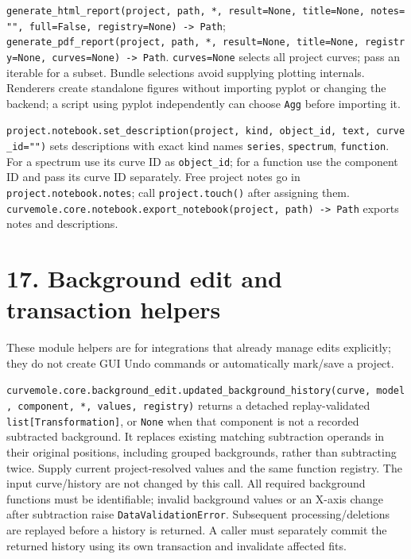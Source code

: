 \documentclass[
  10pt,
  a4paper,
  oneside]{scrreprt}
\begin{document}
\texttt{generate\_html\_report(project,\ path,\ *,\ result=None,\ title=None,\ notes="",\ full=False,\ registry=None)\ -\textgreater{}\ Path};
\texttt{generate\_pdf\_report(project,\ path,\ *,\ result=None,\ title=None,\ registry=None,\ curves=None)\ -\textgreater{}\ Path}.
\texttt{curves=None} selects all project curves; pass an iterable for a
subset. Bundle selections avoid supplying plotting internals. Renderers
create standalone figures without importing pyplot or changing the
backend; a script using pyplot independently can choose \texttt{Agg}
before importing it.

\texttt{project.notebook.set\_description(project,\ kind,\ object\_id,\ text,\ curve\_id="")}
sets descriptions with exact kind names \texttt{series},
\texttt{spectrum}, \texttt{function}. For a spectrum use its curve ID as
\texttt{object\_id}; for a function use the component ID and pass its
curve ID separately. Free project notes go in
\texttt{project.notebook.notes}; call \texttt{project.touch()} after
assigning them.
\texttt{curvemole.core.notebook.export\_notebook(project,\ path)\ -\textgreater{}\ Path}
exports notes and descriptions.

\hypertarget{background-edit-and-transaction-helpers}{%
\section{17. Background edit and transaction
helpers}\label{background-edit-and-transaction-helpers}}

These module helpers are for integrations that already manage edits
explicitly; they do not create GUI Undo commands or automatically
mark/save a project.

\texttt{curvemole.core.background\_edit.updated\_background\_history(curve,\ model,\ component,\ *,\ values,\ registry)}
returns a detached replay-validated \texttt{list{[}Transformation{]}},
or \texttt{None} when that component is not a recorded subtracted
background. It replaces existing matching subtraction operands in their
original positions, including grouped backgrounds, rather than
subtracting twice. Supply current project-resolved values and the same
function registry. The input curve/history are not changed by this call.
All required background functions must be identifiable; invalid
background values or an X-axis change after subtraction raise
\texttt{DataValidationError}. Subsequent processing/deletions are
replayed before a history is returned. A caller must separately commit
the returned history using its own transaction and invalidate affected
fits.
\end{document}

